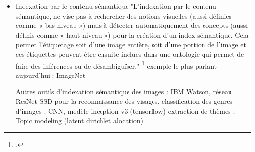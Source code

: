 \begin{itemize}
\subitem Line segment detection and description

"« As a typical two-dimensional (2D) low-level image feature, line segments contain more structural and geometric features about the scene than points, as shown in Fig. 1. In addition, they have the advantage of compact data expression and strong orientation constraints, and can completely support multiview geometry theory in both 2D and three-dimensional (3D) spaces, compared with edges. »\footcite{lin2024}
L'analyse par lignes surpasse l'analyse par pixel/points, car elle permet une analyse géométrique de l'image et une meilleur classification de lieux par exemple : décor, perspective, architectures. L'analyse par segment permet ausi de réduire la taille de calcul par rapport à une anayse de contours de l'image par exemple : un segment ets relié par deux points donc prend moins de place. 

« Gradient grouping-based methods [...] lack adequate semantic and global feature constraints, the region candidates are easily interrupted by noise and small occlusion. [...] Learning-based approaches tend to detect semantically meaningful line segments, such as those in indoor scenarios. In addition, similar to point features, they struggle to detect highly accurate line segments. One reason lies in that images are often downsized during training. »\footcite{lin2024}

\subitem Gallica.pix 

\footcite{moiraghi2018}


\item Indexation par le contenu sémantique 
"L'indexation par le contenu sémantique, ne vise pas à rechercher des notions visuelles (aussi définies comme « bas niveau ») mais à détecter automatiquement des concepts (aussi définis comme « haut niveau ») pour la création d’un index sémantique. Cela permet l’étiquetage soit d’une image entière, soit d’une portion de l’image et ces étiquettes peuvent être ensuite inclues dans une ontologie qui permet de faire des inférences ou de désambiguïser."
\footcite{moiraghi2018}
exemple le plus parlant aujourd'hui : ImageNet 

Autres outils d'indexation sémantique des images : IBM Watson, réseau ResNet SSD pour la reconnaissance des visages. 
classification des genres d'images : CNN, modèle inception v3 (tensorflow)
extraction de thèmes : Topic modeling (latent dirichlet alocation)


\end{itemize}